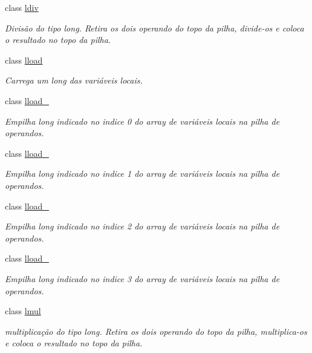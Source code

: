 \begin{DoxyCompactItemize}
class \hyperlink{class_instruction_impl_1_1ldiv}{ldiv}
\begin{DoxyCompactList}\small\item\em Divisão do tipo long. Retira os dois operando do topo da pilha, divide-\/os e coloca o resultado no topo da pilha. \end{DoxyCompactList}\item 
class \hyperlink{class_instruction_impl_1_1lload}{lload}
\begin{DoxyCompactList}\small\item\em Carrega um long das variáveis locais. \end{DoxyCompactList}\item 
class \hyperlink{class_instruction_impl_1_1lload__0}{lload\+\_}
\begin{DoxyCompactList}\small\item\em Empilha long indicado no indice 0 do array de variáveis locais na pilha de operandos. \end{DoxyCompactList}\item 
class \hyperlink{class_instruction_impl_1_1lload__1}{lload\+\_}
\begin{DoxyCompactList}\small\item\em Empilha long indicado no indice 1 do array de variáveis locais na pilha de operandos. \end{DoxyCompactList}\item 
class \hyperlink{class_instruction_impl_1_1lload__2}{lload\+\_}
\begin{DoxyCompactList}\small\item\em Empilha long indicado no indice 2 do array de variáveis locais na pilha de operandos. \end{DoxyCompactList}\item 
class \hyperlink{class_instruction_impl_1_1lload__3}{lload\+\_}
\begin{DoxyCompactList}\small\item\em Empilha long indicado no indice 3 do array de variáveis locais na pilha de operandos. \end{DoxyCompactList}\item 
class \hyperlink{class_instruction_impl_1_1lmul}{lmul}
\begin{DoxyCompactList}\small\item\em multiplicação do tipo long. Retira os dois operando do topo da pilha, multiplica-\/os e coloca o resultado no topo da pilha. \end{DoxyCompactList}\item 

\end{DoxyCompactItemize}
